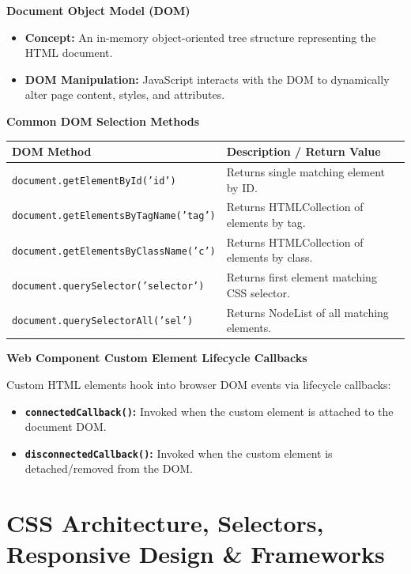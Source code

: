 \documentclass[8pt, a4paper]{article}
\begin{document}
\begin{conceptbox}
\textbf{Document Object Model (DOM)}
\begin{itemize}
  \item \textbf{Concept:} An in-memory object-oriented tree structure representing the HTML document.
  \item \textbf{DOM Manipulation:} JavaScript interacts with the DOM to dynamically alter page content,
        styles, and attributes.
\end{itemize}

\smallskip
\textbf{Common DOM Selection Methods}

\smallskip
\begin{tabularx}{\linewidth}{l X}
  \toprule
  \textbf{DOM Method} & \textbf{Description / Return Value} \\
  \midrule
  \texttt{document.getElementById('id')}        & Returns single matching element by ID. \\
  \texttt{document.getElementsByTagName('tag')} & Returns HTMLCollection of elements by tag. \\
  \texttt{document.getElementsByClassName('c')} & Returns HTMLCollection of elements by class. \\
  \texttt{document.querySelector('selector')}   & Returns first element matching CSS selector. \\
  \texttt{document.querySelectorAll('sel')}      & Returns NodeList of all matching elements. \\
  \bottomrule
\end{tabularx}
\end{conceptbox}

\begin{conceptbox}
\textbf{Web Component Custom Element Lifecycle Callbacks}

Custom HTML elements hook into browser DOM events via lifecycle callbacks:
\begin{itemize}
  \item \textbf{\texttt{connectedCallback()}:} Invoked when the custom element is attached to the document DOM.
  \item \textbf{\texttt{disconnectedCallback()}:} Invoked when the custom element is detached/removed from the DOM.
\end{itemize}
\end{conceptbox}

\section{CSS Architecture, Selectors, Responsive Design \& Frameworks}
\end{document}
